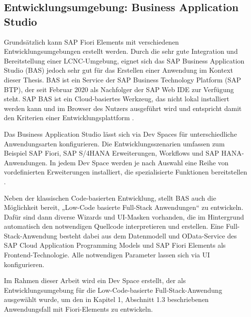 \subsection{Entwicklungsumgebung: Business Application Studio} 
Grundsätzlich kann SAP Fiori Elements mit verschiedenen Entwicklungsumgebungen erstellt werden. Durch die sehr gute Integration und Bereitstellung einer LCNC-Umgebung, eignet sich das SAP Business Application Studio (BAS) jedoch sehr gut für das Erstellen einer Anwendung im Kontext dieser Thesis. BAS ist ein Service der SAP Business Technology Platform (SAP BTP), der seit Februar 2020 als Nachfolger der SAP Web IDE zur Verfügung steht. SAP BAS ist ein Cloud-basiertes Werkzeug, das nicht lokal installiert werden kann und im Browser des Nutzers ausgeführt wird und entspricht damit den Kriterien einer Entwicklungsplattform \cite{btp:ov}.

Das Business Application Studio lässt sich via Dev Spaces für unterschiedliche Anwendungsarten konfigurieren. Die Entwicklungsszenarien umfassen zum Beispiel SAP Fiori, SAP S/4HANA Erweiterungen, Workflows und SAP HANA-Anwendungen. In jedem Dev Space werden je nach Auswahl eine Reihe von vordefinierten Erweiterungen installiert, die spezialisierte Funktionen bereitstellen \cite{btp:ov}.

Neben der klassischen Code-basierten Entwicklung, stellt BAS auch die Möglichkeit bereit, „Low-Code basierte Full-Stack Anwendungen“ zu entwickeln. Dafür sind dann diverse Wizards und UI-Masken vorhanden, die im Hintergrund automatisch den notwendigen Quellcode interpretieren und erstellen. Eine Full-Stack-Anwendung besteht dabei aus dem Datenmodell und OData-Service des SAP Cloud Application Programming Models und SAP Fiori Elements als Frontend-Technologie. Alle notwendigen Parameter lassen sich via UI konfigurieren.

Im Rahmen dieser Arbeit wird ein Dev Space erstellt, der als Entwicklungsumgebung für die Low-Code-basierte Full-Stack-Anwendung ausgewählt wurde, um den in Kapitel 1, Abschnitt 1.3 beschriebenen Anwendungsfall mit Fiori-Elements zu entwickeln. 

